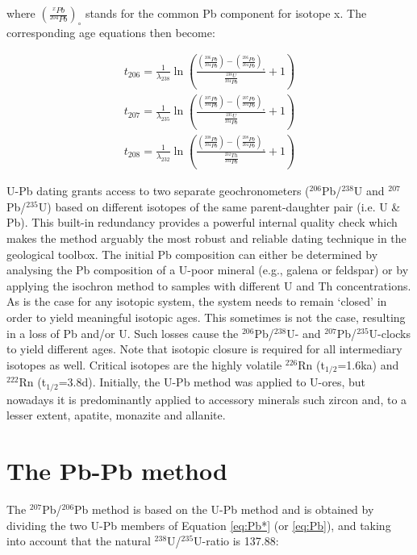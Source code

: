 \documentclass{book}
\begin{document}
where $\left(\frac{^{x}Pb}{^{204}Pb}\right)_\circ$ stands for the
common Pb component for isotope x. The corresponding age equations
then become:

\begin{equation}
\begin{array}{c}
  t_{206}=\frac{1}{\lambda_{238}}\ln\left(\frac{\left(\frac{^{206}Pb}{^{204}Pb}\right)-
    \left(\frac{^{206}Pb}{^{204}Pb}\right)_\circ}{\frac{^{238}U}{^{204}Pb}}+1\right)\\
  t_{207}=\frac{1}{\lambda_{235}}\ln\left(\frac{\left(\frac{^{207}Pb}{^{204}Pb}\right)-
    \left(\frac{^{207}Pb}{^{204}Pb}\right)_\circ}{\frac{^{235}U}{^{204}Pb}}+1\right)\\
  t_{208}=\frac{1}{\lambda_{232}}\ln\left(\frac{\left(\frac{^{208}Pb}{^{204}Pb}\right)-
    \left(\frac{^{208}Pb}{^{204}Pb}\right)_\circ}{\frac{^{232}Th}{^{204}Pb}}+1\right)
\end{array}
\label{eq:tPb}
\end{equation}

U-Pb dating grants access to two separate geochronometers
($^{206}$Pb/${}^{238}$U and $^{207}$Pb/${}^{235}$U) based on different
isotopes of the same parent-daughter pair (i.e. U \& Pb).  This
built-in redundancy provides a powerful internal quality check which
makes the method arguably the most robust and reliable dating
technique in the geological toolbox. The initial Pb composition can
either be determined by analysing the Pb composition of a U-poor
mineral (e.g., galena or feldspar) or by applying the isochron method
to samples with different U and Th concentrations. As is the case for
any isotopic system, the system needs to remain `closed' in order to
yield meaningful isotopic ages.  This sometimes is not the case,
resulting in a loss of Pb and/or U.  Such losses cause the
$^{206}$Pb/$^{238}$U- and $^{207}$Pb/$^{235}$U-clocks to yield
different ages. Note that isotopic closure is required for all
intermediary isotopes as well.  Critical isotopes are the highly
volatile $^{226}$Rn (t$_{1/2}$=1.6ka) and $^{222}$Rn
(t$_{1/2}$=3.8d). Initially, the U-Pb method was applied to U-ores,
but nowadays it is predominantly applied to accessory minerals such
zircon and, to a lesser extent, apatite, monazite and allanite.

\section{The Pb-Pb method}
\label{sec:Pb-Pb}

The $^{207}$Pb/$^{206}$Pb method is based on the U-Pb method and is
obtained by dividing the two U-Pb members of Equation \ref{eq:Pb*} (or
\ref{eq:Pb}), and taking into account that the natural
$^{238}$U/$^{235}$U-ratio is 137.88:
\end{document}

